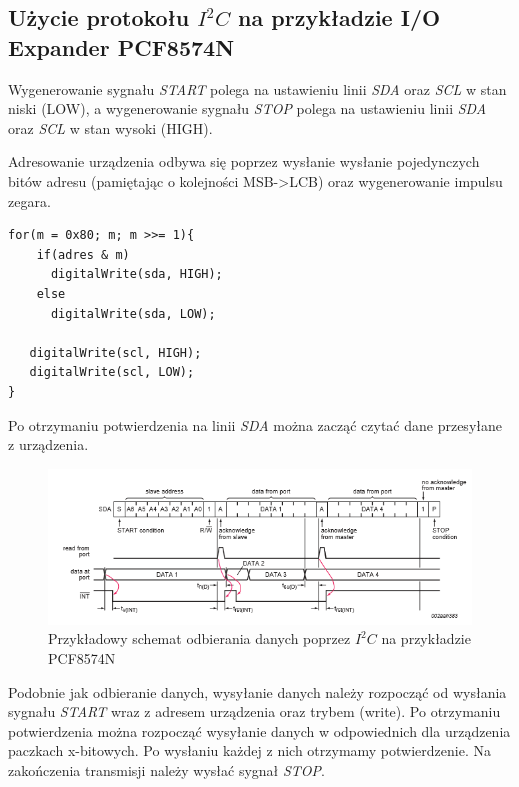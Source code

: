 \documentclass{xmgr}
\begin{document}
\subsection{Użycie protokołu $I^2C$ na przykładzie I/O Expander PCF8574N}
Wygenerowanie sygnału \emph{START} polega na ustawieniu linii \emph{SDA} oraz \emph{SCL} w stan niski (LOW), a wygenerowanie sygnału \emph{STOP} polega na ustawieniu linii \emph{SDA} oraz \emph{SCL} w stan wysoki (HIGH).

Adresowanie urządzenia odbywa się poprzez wysłanie wysłanie pojedynczych bitów adresu (pamiętając o kolejności MSB->LCB) oraz wygenerowanie impulsu zegara.
\begin{lstlisting}[label=bot-dirs-alg,caption=Adresowanie urządzenia $I^2C$ na przykładzie PCF8574N]
for(m = 0x80; m; m >>= 1){
    if(adres & m)         
      digitalWrite(sda, HIGH);
    else
      digitalWrite(sda, LOW);
        
   digitalWrite(scl, HIGH);
   digitalWrite(scl, LOW); 
}
\end{lstlisting}
Po otrzymaniu potwierdzenia na linii \emph{SDA} można zacząć czytać dane przesyłane z urządzenia.

\begin{figure}[!h]
    \centering
    \includegraphics[height=0.2\textheight]{images/read_i2c.png}
    \caption{Przykładowy schemat odbierania danych poprzez $I^2C$ na przykładzie PCF8574N\label{$I^2C$}}
\end{figure}

Podobnie jak odbieranie danych, wysyłanie danych należy rozpocząć od wysłania sygnału \emph{START} wraz z adresem urządzenia oraz trybem (write). Po otrzymaniu potwierdzenia można rozpocząć wysyłanie danych w odpowiednich dla urządzenia paczkach x-bitowych. Po wysłaniu każdej z nich otrzymamy potwierdzenie. Na zakończenia transmisji należy wysłać sygnał \emph{STOP}.
\end{document}
